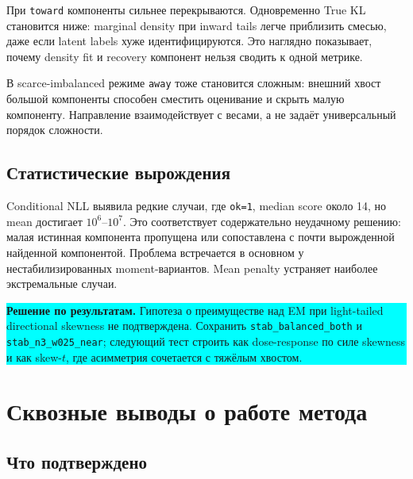 \documentclass[11pt,a4paper]{article}
\newcommand{\code}[1]{{\footnotesize\nolinkurl{#1}}}
\newcommand{\decision}[1]{%
  \begin{center}
  \colorbox{cyan}{\parbox{0.94\linewidth}{%
    \textbf{\sffamily\color{navy}Решение по результатам.} #1}}
  \end{center}
}
\begin{document}
При \code{toward} компоненты сильнее перекрываются. Одновременно True KL
становится ниже: marginal density при inward tails легче приблизить смесью,
даже если latent labels хуже идентифицируются. Это наглядно показывает,
почему density fit и recovery компонент нельзя сводить к одной метрике.

В scarce-imbalanced режиме \code{away} тоже становится сложным: внешний
хвост большой компоненты способен сместить оценивание и скрыть малую
компоненту. Направление взаимодействует с весами, а не задаёт универсальный
порядок сложности.

\subsection{Статистические вырождения}

Conditional NLL выявила редкие случаи, где \code{ok=1}, median score около
14, но mean достигает $10^6$--$10^7$. Это соответствует содержательно
неудачному решению: малая истинная компонента пропущена или сопоставлена с
почти вырожденной найденной компонентой. Проблема встречается в основном у
нестабилизированных moment-вариантов. Mean penalty устраняет наиболее
экстремальные случаи.

\decision{Гипотеза о преимуществе над EM при light-tailed directional
skewness не подтверждена. Сохранить \code{stab_balanced_both} и
\code{stab_n3_w025_near}; следующий тест строить как dose-response по силе
skewness и как skew-$t$, где асимметрия сочетается с тяжёлым хвостом.}

\section{Сквозные выводы о работе метода}

\subsection{Что подтверждено}
\end{document}
